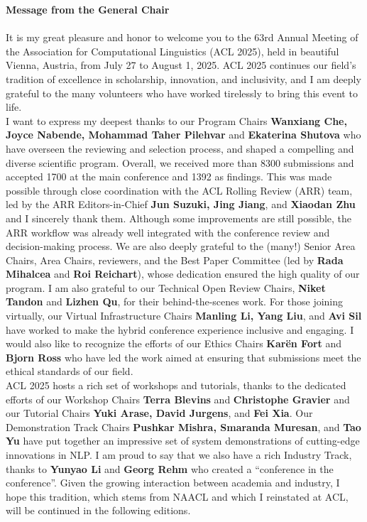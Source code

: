 \textbf{Message from the General Chair}\\
\\

It is my great pleasure and honor to welcome you to the 63rd Annual Meeting of the Association for Computational Linguistics (ACL 2025), held in beautiful Vienna, Austria, from July 27 to August 1, 2025. ACL 2025 continues our field’s tradition of excellence in scholarship, innovation, and inclusivity, and I am deeply grateful to the many volunteers who have worked tirelessly to bring this event to life.\\


I want to express my deepest thanks to our Program Chairs	\textemdash \textbf{Wanxiang Che, Joyce Nabende, Mohammad Taher Pilehvar} and \textbf{Ekaterina Shutova} \textemdash who have overseen the reviewing and selection process, and shaped a compelling and diverse scientific program. Overall, we received more than 8300 submissions and accepted 1700 at the main conference and 1392 as findings. This was made possible through close coordination with the ACL Rolling Review (ARR) team, led by the ARR Editors-in-Chief \textemdash \textbf{Jun Suzuki, Jing Jiang}, and \textbf{Xiaodan Zhu} \textemdash and I sincerely thank them. Although some improvements are still possible, the ARR workflow was already well integrated with the conference review and decision-making process. We are also deeply grateful to the (many!) Senior Area Chairs, Area Chairs, reviewers, and the Best Paper Committee (led by \textbf{Rada Mihalcea} and \textbf{Roi Reichart}), whose dedication ensured the high quality of our program. I am also grateful to our Technical Open Review Chairs, \textbf{Niket Tandon} and \textbf{Lizhen Qu}, for their behind-the-scenes work. For those joining virtually, our Virtual Infrastructure Chairs \textemdash \textbf{Manling Li, Yang Liu}, and \textbf{Avi Sil} \textemdash have worked to make the hybrid conference experience inclusive and engaging. I would also like to recognize the efforts of our Ethics Chairs \textemdash \textbf{Karën Fort} and \textbf{Bjorn Ross} \textemdash who have led the work aimed at ensuring that submissions meet the ethical standards of our field. \\


ACL 2025 hosts a rich set of workshops and tutorials, thanks to the dedicated efforts of our Workshop Chairs 	\textemdashh \textbf{Terra Blevins} and \textbf{Christophe Gravier} \textemdash and our Tutorial Chairs \textemdash \textbf{Yuki Arase, David Jurgens}, and \textbf{Fei Xia}. Our Demonstration Track Chairs \textemdash \textbf{Pushkar Mishra, Smaranda Muresan}, and \textbf{Tao Yu} \textemdash have put together an impressive set of system demonstrations of cutting-edge innovations in NLP. I am proud to say that we also have a rich Industry Track, thanks to \textbf{Yunyao Li} and \textbf{Georg Rehm} who created a “conference in the conference”. Given the growing interaction between academia and industry, I hope this tradition, which stems from NAACL and which I reinstated at ACL, will be continued in the following editions.\\


